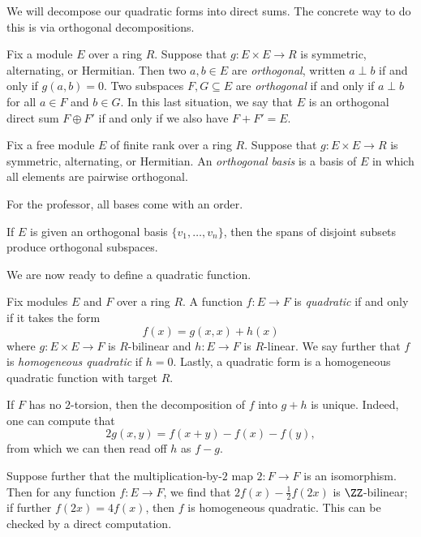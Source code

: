 \documentclass[../notes.tex]{subfiles}
\begin{document}
We will decompose our quadratic forms into direct sums. The concrete way to do this is via orthogonal decompositions.
\begin{definition}[orthogonal]
	Fix a module $E$ over a ring $R$. Suppose that $g\colon E\times E\to R$ is symmetric, alternating, or Hermitian. Then two $a,b\in E$ are \textit{orthogonal}, written $a\perp b$ if and only if $g(a,b)=0$. Two subspaces $F,G\subseteq E$ are \textit{orthogonal} if and only if $a\perp b$ for all $a\in F$ and $b\in G$. In this last situation, we say that $E$ is an orthogonal direct sum $F\oplus F'$ if and only if we also have $F+F'=E$.
\end{definition}
\begin{definition}
	Fix a free module $E$ of finite rank over a ring $R$. Suppose that $g\colon E\times E\to R$ is symmetric, alternating, or Hermitian. An \textit{orthogonal basis} is a basis of $E$ in which all elements are pairwise orthogonal.
\end{definition}
\begin{remark}
	For the professor, all bases come with an order.
\end{remark}
\begin{remark}
	If $E$ is given an orthogonal basis $\{v_1,\ldots,v_n\}$, then the spans of disjoint subsets produce orthogonal subspaces.
\end{remark}
We are now ready to define a quadratic function.
\begin{definition}[quadratic]  
	Fix modules $E$ and $F$ over a ring $R$. A function $f\colon E\to F$ is \textit{quadratic} if and only if it takes the form
	\[f(x)=g(x,x)+h(x)\]
	where $g\colon E\times E\to F$ is $R$-bilinear and $h\colon E\to F$ is $R$-linear. We say further that $f$ is \textit{homogeneous quadratic} if $h=0$. Lastly, a quadratic form is a homogeneous quadratic function with target $R$.
\end{definition}
\begin{remark}
	If $F$ has no $2$-torsion, then the decomposition of $f$ into $g+h$ is unique. Indeed, one can compute that
	\[2g(x,y)=f(x+y)-f(x)-f(y),\]
	from which we can then read off $h$ as $f-g$.
\end{remark}
\begin{remark}
	Suppose further that the multiplication-by-$2$ map $2\colon F\to F$ is an isomorphism. Then for any function $f\colon E\to F$, we find that $2f(x)-\frac12f(2x)$ is $\ZZ$-bilinear; if further $f(2x)=4f(x)$, then $f$ is homogeneous quadratic. This can be checked by a direct computation.
\end{remark}
\end{document}

